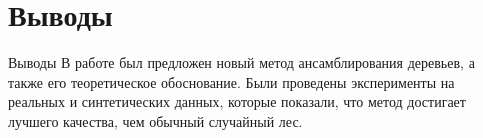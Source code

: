 \documentclass[10pt,pdf,hyperref={unicode}]{beamer}
\begin{document}
\section{Выводы}
\begin{frame}{Выводы}
\justifying
В работе был предложен новый метод ансамблирования деревьев, а также его теоретическое обоснование. Были проведены эксперименты на реальных и синтетических данных, которые показали, что метод достигает лучшего качества, чем обычный случайный лес. 
\end{frame}
\end{document}
